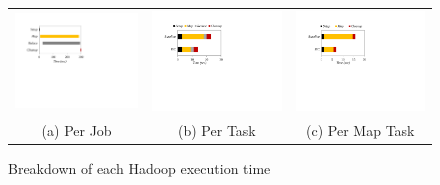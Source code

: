 \begin{figure}[t]
  \centering
  \renewcommand{\tabcolsep}{0.1mm}
  \begin{tabular}{ccc}
 \includegraphics[width=0.69\columnwidth]{figures/Hadoop_execution_time_each_phase_breakdown2.pdf}&
  \includegraphics[width=0.69\columnwidth]{figures/Hadoop_time_breakdown1.pdf}&
  \includegraphics[width=0.69\columnwidth]{figures/Hadoop_breakdown_per_maptask1.pdf}\\	
  (a) Per Job & (b) Per Task & (c) Per Map Task
\end{tabular}
  \caption{Breakdown of each Hadoop execution time}
  \label{fig:time_breakdown}
 \end{figure}




